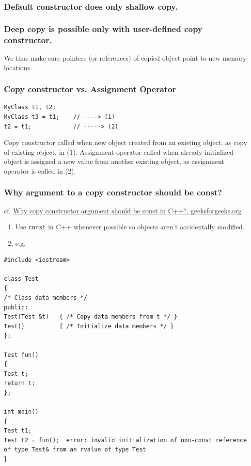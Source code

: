 \documentclass[10pt]{amsart}
\begin{document}
\subsubsection{Default constructor does only shallow copy.}  

\subsubsection{Deep copy is possible only with user-defined copy constructor.}  

We thus make sure pointers (or references) of copied object point to new memory locations.  

\subsubsection{Copy constructor vs. Assignment Operator}  

\begin{lstlisting}  
MyClass t1, t2; 
MyClass t3 = t1; 	// ----> (1)
t2 = t1; 			// -----> (2)
\end{lstlisting}

Copy constructor called when new object created from an existing object, as copy of existing object, in (1).  
Assignment operator called when already initialized object is assigned a new value from another existing object, as assignment operator is called in (2).  

\subsubsection{Why argument to a copy constructor should be const?  } 

cf. \href{http://www.geeksforgeeks.org/copy-constructor-argument-const/}{Why copy constructor argument should be const in C++?, geeksforgeeks.org}

\begin{enumerate}
	\item Use \verb|const| in C++ whenever possible so objects aren't accidentally modified.  
	\item e.g.  
\end{enumerate}

\begin{lstlisting}  
#include <iostream>  

class Test
{
/* Class data members */
public:
Test(Test &t) 	{ /* Copy data members from t */ } 
Test()			{ /* Initialize data members */ }
};

Test fun() 
{
Test t;
return t;
};

int main()
{
Test t1;
Test t2 = fun();  error: invalid initialization of non-const reference of type Test& from an rvalue of type Test
}
\end{lstlisting}
\end{document}
